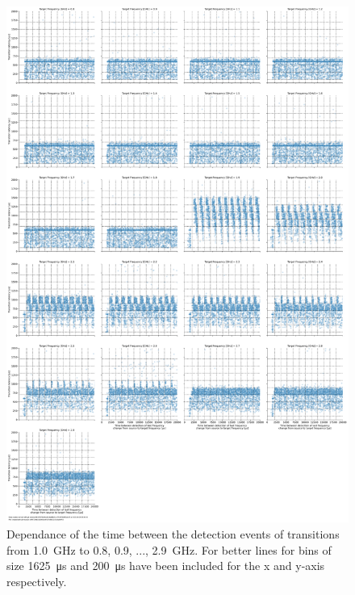 \begin{figure}[]
    \centering
    \includegraphics[width=\columnwidth]{fig/ftalat/ftalat_scatter_wait_transition_latency_hati_source_1.0.pdf}
    \caption{Dependance of the time between the detection events of transitions from \SI{1.0}{\GHz} to \SI{0.8}{}, \SI{0.9}{}, ..., \SI{2.9}{\GHz}. For better lines for bins of size \SI{1625}{\us} and \SI{200}{\us} have been included for the x and y-axis respectively.}
\end{figure}
